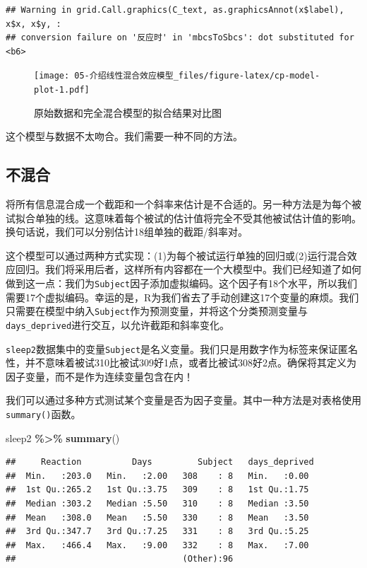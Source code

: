 \documentclass[
]{book}
\newenvironment{Shaded}{\begin{snugshade}}{\end{snugshade}}
\newcommand{\FunctionTok}[1]{\textcolor[rgb]{0.13,0.29,0.53}{\textbf{#1}}}
\newcommand{\NormalTok}[1]{#1}
\newcommand{\SpecialCharTok}[1]{\textcolor[rgb]{0.81,0.36,0.00}{\textbf{#1}}}
\begin{document}
\begin{verbatim}
## Warning in grid.Call.graphics(C_text, as.graphicsAnnot(x$label), x$x, x$y, :
## conversion failure on '反应时' in 'mbcsToSbcs': dot substituted for <b6>
\end{verbatim}

\begin{figure}
\centering
\texttt{[image: 05-介绍线性混合效应模型\_files/figure-latex/cp-model-plot-1.pdf]}
\caption{\label{fig:cp-model-plot}原始数据和完全混合模型的拟合结果对比图}
\end{figure}

这个模型与数据不太吻合。我们需要一种不同的方法。

\hypertarget{ux4e0dux6df7ux5408}{%
\subsection{不混合}\label{ux4e0dux6df7ux5408}}

将所有信息混合成一个截距和一个斜率来估计是不合适的。另一种方法是为每个被试拟合单独的线。这意味着每个被试的估计值将完全不受其他被试估计值的影响。换句话说，我们可以分别估计18组单独的截距/斜率对。

这个模型可以通过两种方式实现：(1)为每个被试运行单独的回归或(2)运行混合效应回归。我们将采用后者，这样所有内容都在一个大模型中。我们已经知道了如何做到这一点：我们为\texttt{Subject}因子添加虚拟编码。这个因子有18个水平，所以我们需要17个虚拟编码。幸运的是，R为我们省去了手动创建这17个变量的麻烦。我们只需要在模型中纳入\texttt{Subject}作为预测变量，并将这个分类预测变量与\texttt{days\_deprived}进行交互，以允许截距和斜率变化。

\texttt{sleep2}数据集中的变量\texttt{Subject}是名义变量。我们只是用数字作为标签来保证匿名性，并不意味着被试310比被试309好1点，或者比被试308好2点。确保将其定义为因子变量，而不是作为连续变量包含在内！

我们可以通过多种方式测试某个变量是否为因子变量。其中一种方法是对表格使用\texttt{summary()}函数。

\begin{Shaded}
\begin{Highlighting}[]
\NormalTok{sleep2 }\SpecialCharTok{\%\textgreater{}\%} \FunctionTok{summary}\NormalTok{()}
\end{Highlighting}
\end{Shaded}

\begin{verbatim}
##     Reaction          Days         Subject   days_deprived 
##  Min.   :203.0   Min.   :2.00   308    : 8   Min.   :0.00  
##  1st Qu.:265.2   1st Qu.:3.75   309    : 8   1st Qu.:1.75  
##  Median :303.2   Median :5.50   310    : 8   Median :3.50  
##  Mean   :308.0   Mean   :5.50   330    : 8   Mean   :3.50  
##  3rd Qu.:347.7   3rd Qu.:7.25   331    : 8   3rd Qu.:5.25  
##  Max.   :466.4   Max.   :9.00   332    : 8   Max.   :7.00  
##                                 (Other):96
\end{verbatim}
\end{document}
